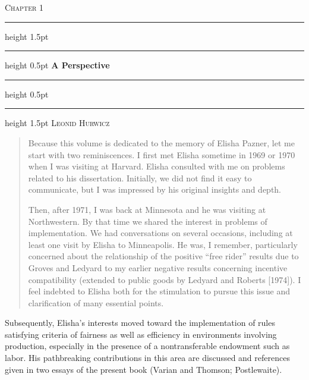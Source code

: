 \documentclass[12pt, letterpaper]{article}
\newenvironment{reminiscence}{%
    \itshape\color{black!85}%
    \begin{quote}%
}{%
    \end{quote}%
}
\begin{document}

\begin{center}
    \vspace*{1cm}
    {\color{SlateGray}\textsc{Chapter 1}} \\
    \vspace{0.4cm}
    \hrule height 1.5pt
    \vspace{0.2cm}
    \hrule height 0.5pt
    \vspace{0.6cm}
    {\huge\bfseries\color{MidnightBlue} A Perspective} \\
    \vspace{0.6cm}
    \hrule height 0.5pt
    \vspace{0.2cm}
    \hrule height 1.5pt
    \vspace{0.8cm}
    {\Large\scshape Leonid Hurwicz} \\
    \vspace{1.5cm}
\end{center}

\begin{reminiscence}
Because this volume is dedicated to the memory of Elisha Pazner, let me start with two reminiscences. I first met Elisha sometime in 1969 or 1970 when I was visiting at Harvard. Elisha consulted with me on problems related to his dissertation. Initially, we did not find it easy to communicate, but I was impressed by his original insights and depth. 

Then, after 1971, I was back at Minnesota and he was visiting at Northwestern. By that time we shared the interest in problems of implementation. We had conversations on several occasions, including at least one visit by Elisha to Minneapolis. He was, I remember, particularly concerned about the relationship of the positive ``free rider'' results due to Groves and Ledyard to my earlier negative results concerning incentive compatibility (extended to public goods by Ledyard and Roberts [1974]). I feel indebted to Elisha both for the stimulation to pursue this issue and clarification of many essential points.
\end{reminiscence}

\medskip

Subsequently, Elisha's interests moved toward the implementation of rules satisfying criteria of fairness as well as efficiency in environments involving production, especially in the presence of a nontransferable endowment such as labor. His pathbreaking contributions in this area are discussed and references given in two essays of the present book (Varian and Thomson; Postlewaite).
\end{document}

